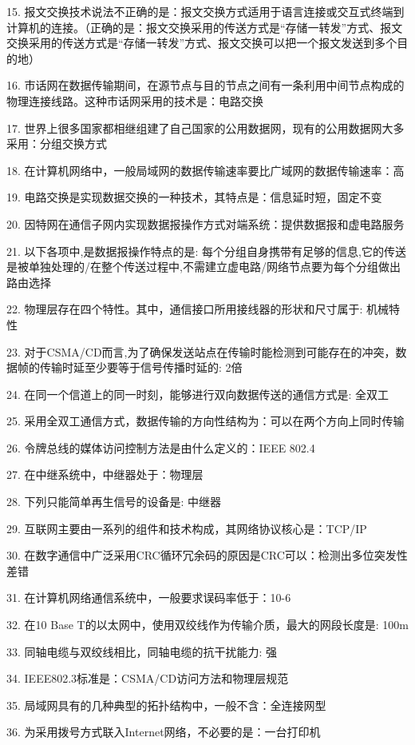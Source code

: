 \documentclass[fleqn]{article}
\begin{document}
15. 报文交换技术说法不正确的是：报文交换方式适用于语言连接或交互式终端到计算机的连接。（正确的是：报文交换采用的传送方式是“存储一转发”方式、报文交换采用的传送方式是“存储一转发”方式、报文交换可以把一个报文发送到多个目的地）

16. 市话网在数据传输期间，在源节点与目的节点之间有一条利用中间节点构成的物理连接线路。这种市话网采用的技术是：电路交换

17. 世界上很多国家都相继组建了自己国家的公用数据网，现有的公用数据网大多采用：分组交换方式

18. 在计算机网络中，一般局域网的数据传输速率要比广域网的数据传输速率：高

19. 电路交换是实现数据交换的一种技术，其特点是：信息延时短，固定不变

20. 因特网在通信子网内实现数据报操作方式对端系统：提供数据报和虚电路服务

21. 以下各项中,是数据报操作特点的是: 每个分组自身携带有足够的信息,它的传送是被单独处理的/在整个传送过程中,不需建立虚电路/网络节点要为每个分组做出路由选择

22. 物理层存在四个特性。其中，通信接口所用接线器的形状和尺寸属于: 机械特性

23. 对于CSMA/CD而言,为了确保发送站点在传输时能检测到可能存在的冲突，数据帧的传输时延至少要等于信号传播时延的: 2倍

24. 在同一个信道上的同一时刻，能够进行双向数据传送的通信方式是: 全双工

25. 采用全双工通信方式，数据传输的方向性结构为：可以在两个方向上同时传输

26. 令牌总线的媒体访问控制方法是由什么定义的：IEEE 802.4

27. 在中继系统中，中继器处于：物理层

28. 下列只能简单再生信号的设备是: 中继器

29. 互联网主要由一系列的组件和技术构成，其网络协议核心是：TCP/IP

30. 在数字通信中广泛采用CRC循环冗余码的原因是CRC可以：检测出多位突发性差错

31. 在计算机网络通信系统中，一般要求误码率低于：10-6

32. 在10 Base T的以太网中，使用双绞线作为传输介质，最大的网段长度是: 100m

33. 同轴电缆与双绞线相比，同轴电缆的抗干扰能力: 强

34. IEEE802.3标准是：CSMA/CD访问方法和物理层规范

35. 局域网具有的几种典型的拓扑结构中，一般不含：全连接网型

36. 为采用拨号方式联入Internet网络，不必要的是：一台打印机
\end{document}
